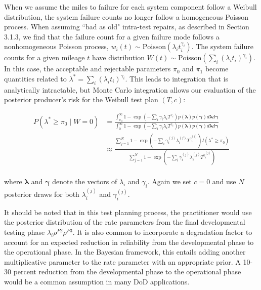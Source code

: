 \documentclass[12pt]{article}
\renewcommand{\vec}[1]{\mathbf{#1}}
\begin{document}
When we assume the miles to failure for each system component follow a Weibull
distribution, the system failure counts no longer follow a homogeneous Poisson
process.  When assuming ``bad as old" intra-test repairs, as described in Section 3.1.3, we find that the
failure count for a given failure mode follows a nonhomogeneous Poisson
process, $w_i(t) \sim \text{Poisson}( \lambda_i t_i^{\gamma_i} )$.  The system
failure counts for a given mileage $t$ have distribution $W(t) \sim
\text{Poisson}(\sum_i (\lambda_i t_i)^{\gamma_i})$.  In this case, the acceptable
and rejectable parameters $\pi_0$ and $\pi_1$ become quantities related to
$\lambda^* = \sum_i (\lambda_i t_i)^{\gamma_i}$.  This leads to integration that is analytically intractable, but Monte Carlo integration
allows our evaluation of the posterior producer's risk for the Weibull test plan
$(T,c)$:

$$
\begin{aligned}
	 P(\lambda^* \geq \pi_0 \; \vert \; W = 0) &= \frac{
	 \int_{\pi_0}^{\infty} 1 - \exp(- \sum_i \gamma_i \lambda_i
	 T^{\gamma_i})p(\vec{\lambda}) p(\vec{\gamma}) d\vec{\lambda}
	 d\vec{\gamma}} {\int_{0}^{\infty} 1 - \exp(- \sum_i \gamma_i \lambda_i
	 T^{\gamma_i})p(\vec{\lambda}) p(\vec{\gamma}) d\vec{\lambda}
	 d\vec{\gamma}} \\
   &\approx \frac{\sum_{j = 1}^{N} 1 - \exp(-\sum_i \gamma_i^{(j)}
   \lambda_i^{(j)} T^{\gamma_i^{(j)}}) I(\lambda^* \geq \pi_0)} {\sum_{j = 1}^{N} 1 - \exp(- \sum_i
   \gamma_i^{(j)} \lambda_i^{(j)} T^{\gamma_i^{(j)}})}
\end{aligned}
$$
\\
where $\vec{\lambda}$ and $\vec{\gamma}$ denote the vectors of $\lambda_i$ and $\gamma_i$. Again we set $c = 0$ and use $N$ posterior draws for both $\lambda_i^{(j)}$ and
$\gamma_i^{(j)}$.

It should be noted that in this test planning process, the practitioner would use
the posterior distribution of the rate parameters from the final developmental
testing phase $\lambda_i\rho^{P2}\rho^{P3}$.  It is also common to incorporate a
degradation factor to account for an expected reduction in reliability from the
developmental phase to the operational phase.  In the Bayesian framework, this
entails adding another multiplicative parameter to the rate parameter with an
appropriate prior.   A 10-30 percent reduction from the developmental phase to
the operational phase would be a common assumption in many DoD applications.
\end{document}
